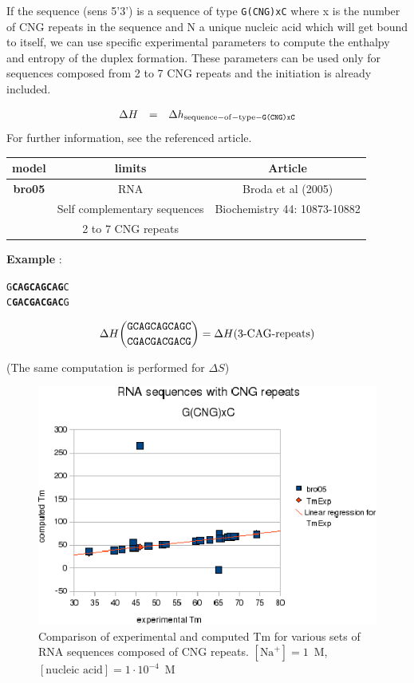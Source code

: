 \documentclass{article}
\begin{document}
If the sequence (sens 5'3') is a sequence of type \texttt{G(CNG)xC} where x is the number of CNG repeats in
the sequence and N a unique nucleic acid which will get bound to itself, we can use specific
experimental parameters to compute the enthalpy and entropy of the duplex formation. These parameters can be used
only for sequences composed from 2 to 7 CNG repeats and the initiation is already included.
 
\begin{displaymath}
  \begin{array}[t]{ccc}
  \Delta{}H&=&\Delta{}h_\mathrm{sequence-of-type-\texttt{G(CNG)xC}}\\
  \end{array}
\end{displaymath}
For further information, see the referenced article.

\begin{table}[h][c]
\begin{tabular}[h]{| c | c | c |}
\textbf{model} & \textbf{limits} & \textbf{Article} \\
 \hline
\textbf{bro05} & RNA & Broda et al (2005) \\
 & Self complementary sequences & Biochemistry 44: 10873-10882\\
 & 2 to 7 CNG repeats & \\
 \hline
\end{tabular}
\end{table}


\textbf{Example} :
\begin{alltt}
G\textbf{CAGCAGCAG}C
C\textbf{GACGACGAC}G
\end{alltt}

\begin{multline*}
\Delta H {\mbox{\texttt{GCAGCAGCAGC}} \choose \mbox{\texttt{CGACGACGACG}}} = 
\Delta H {(\mbox{3-CAG-repeats})}
\end{multline*}

       (The same computation is performed for $\Delta S$)

\begin{figure}[h]
\includegraphics[width=1\linewidth]{images/CNG}
\caption{Comparison of experimental and computed Tm for various sets of
 RNA sequences composed of CNG repeats. $[\mbox{Na}^+] = 1$~M, $[\mbox{nucleic acid}] = 1\cdot{}10^{-4}$~M}
\end{figure}
\end{document}
